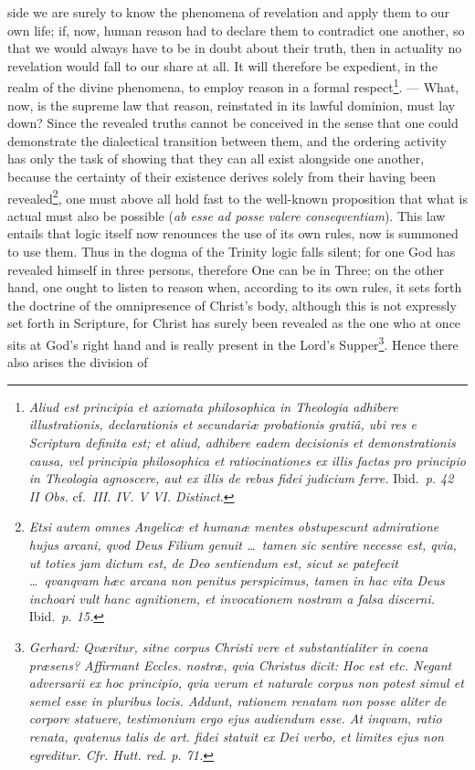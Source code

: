 \documentclass[12pt]{book}
\newcommand{\opage}[1]{\marginnote{\footnotesize\textit{[#1]}}}
\begin{document}
\opage{78} \setcounter{footnote}{0}%
side we are surely to know the phenomena of revelation and apply them to our
own life; if, now, human reason had to declare them to contradict one
another, so that we would always have to be in doubt about their truth, then
in actuality no revelation would fall to our share at all. It will therefore
be expedient, in the realm of the divine phenomena, to employ reason in a
formal respect\footnote{\textit{Aliud est principia et axiomata philosophica
in Theologia adhibere illustrationis, declarationis et secundariæ probationis
gratiâ, ubi res e Scriptura definita est; et aliud, adhibere eadem decisionis
et demonstrationis causa, vel principia philosophica et ratiocinationes ex
illis factas pro principio in Theologia agnoscere, aut ex illis de rebus
fidei judicium ferre.} Ibid.\ \textit{p. 42 II Obs.} cf.\ \textit{III. IV. V
VI. Distinct.}}. --- What, now, is the supreme law that reason, reinstated in
its lawful dominion, must lay down? Since the revealed truths cannot be
conceived in the sense that one could demonstrate the dialectical transition
between them, and the ordering activity has only the task of showing that
they can all exist alongside one another, because the certainty of their
existence derives solely from their having been revealed\footnote{\textit{Etsi
autem omnes Angelicæ et humanæ mentes obstupescunt admiratione hujus arcani,
qvod Deus Filium genuit \ldots\ tamen sic sentire necesse est, qvia, ut
toties jam dictum est, de Deo sentiendum est, sicut se patefecit \ldots\
qvanqvam hæc arcana non penitus perspicimus, tamen in hac vita Deus inchoari
vult hanc agnitionem, et invocationem nostram a falsa discerni.} Ibid.\
\textit{p. 15.}}, one must above all hold fast to the well-known proposition
that what is actual must also be possible (\textit{ab esse ad posse valere
conseqventiam}). This
\opage{79} \setcounter{footnote}{0}%
law entails that logic itself now renounces the use of its own rules, now is
summoned to use them. Thus in the dogma of the Trinity logic falls silent;
for one God has revealed himself in three persons, therefore One can be in
Three; on the other hand, one ought to listen to reason when, according to
its own rules, it sets forth the doctrine of the omnipresence of Christ's
body, although this is not expressly set forth in Scripture, for Christ has
surely been revealed as the one who at once sits at God's right hand and is
really present in the Lord's Supper\footnote{\textit{Gerhard: Qværitur, sitne
corpus Christi vere et substantialiter in coena præsens? Affirmant Eccles.
nostræ, qvia Christus dicit: \emph{Hoc est} etc. Negant adversarii ex hoc
principio, qvia verum et naturale corpus non potest simul et semel esse in
pluribus locis. Addunt, rationem renatam non posse aliter de corpore
statuere, testimonium ergo ejus audiendum esse. At inqvam, ratio renata,
qvatenus talis de art. fidei statuit ex Dei verbo, et limites ejus non
egreditur. Cfr. Hutt. red. p. 71.}}. Hence there also arises the division of
\end{document}
